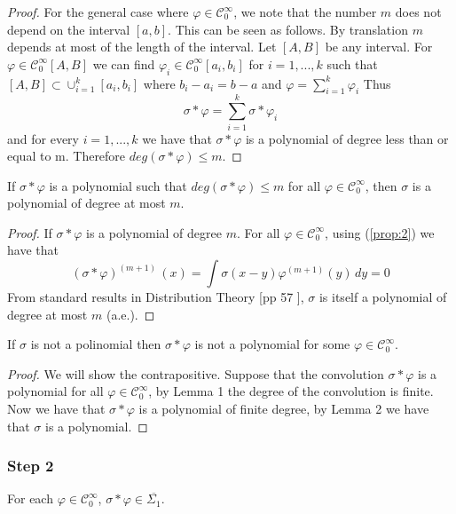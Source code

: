 \documentclass[../main.tex]{subfiles}
\begin{document}
\begin{proof}
		\noindent For the general case where $\varphi \in \mathcal{C}_0^\infty$, we note that the number $m$ does not depend on the interval $[a,b]$. This can be seen as follows. By translation $m$ depends at most of the length of the interval. Let $[A,B]$ be any interval. For $\varphi \in \mathcal{C}^\infty_0[A,B]$ we can find $\varphi_i \in \mathcal{C}^\infty_0[a_i,b_i]$ for $i=1,...,k$ such that $[A,B] \subset \cup_{i=1}^k[a_i,b_i]$ where $b_i -a_i =b-a$ and $\varphi=\sum_{i=1}^k \varphi_i$ Thus $$\sigma \ast \varphi = \sum_{i=1}^k \sigma \ast \varphi_i$$ and for every $i=1,...,k $ we have that $\sigma \ast \varphi$ is a polynomial of degree less than or equal to m. Therefore $deg(\sigma \ast \varphi) \leq m$.
	\end{proof}
	\begin{lema} %
		If $\sigma \ast \varphi$ is a polynomial such that $ deg (\sigma \ast \varphi) \leq m$ for all $\varphi \in \mathcal{C}^\infty_0$, then $\sigma$ is a polynomial of degree at most $m$. 
	\end{lema}
	\begin{proof} 
	If $\sigma \ast \varphi$ is a polynomial of degree $m$.
	For all $\varphi \in \mathcal{C}^\infty_0$, using (\ref{prop:2}) we have that
	$$(\sigma \ast \varphi)^{(m+1)} \, (x)=\int \sigma(x-y)\varphi^{(m+1)}(y) \, dy= 0$$  
	From standard results in Distribution Theory [pp 57 \cite{friedman1963generalized}], $\sigma $ is itself a polynomial of degree at most $m$ (a.e.).
	\end{proof} 
\vspace{\baselineskip} 
\begin{prop}
If $\sigma$ is not a polinomial then $\sigma \ast \varphi$ is not a polynomial for some $\varphi \in \mathcal{C}^\infty_0$. 
\end{prop}
\begin{proof}
We will show the contrapositive. Suppose that the convolution $\sigma \ast \varphi$ is a polynomial for all $\varphi \in \mathcal{C}^\infty_0$, by Lemma 1 the degree of the convolution is finite. Now we have that $\sigma \ast \varphi$ is a polynomial of finite degree, by Lemma 2 we have that $\sigma$ is a polynomial. 
\end{proof}
\vspace{\baselineskip} 
\subsubsection{Step 2}
	\begin{lema} %
		For each $\varphi \in  \mathcal{C}^\infty_0$, $ \sigma \ast \varphi \in  \overline{\Sigma_1}$. 
		
	\end{lema}
	
\end{document}
